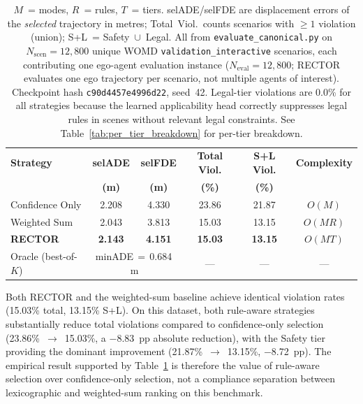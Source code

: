 \begin{table}[t]
\centering
\caption{Selection Strategy Comparison: Accuracy, Compliance, and Complexity (Protocol~A)}
\label{tab:selection_strategy}
\setlength{\tabcolsep}{3pt}
\begin{tabular}{lccccc}
\toprule
\textbf{Strategy} & \textbf{selADE} & \textbf{selFDE} & \textbf{Total Viol.} & \textbf{S+L Viol.} & \textbf{Complexity} \\
 & \textbf{(m)} & \textbf{(m)} & \textbf{(\%)} & \textbf{(\%)} & \\
\midrule
Confidence Only & 2.208 & 4.330 & 23.86 & 21.87 & $O(M)$ \\
Weighted Sum & 2.043 & 3.813 & 15.03 & 13.15 & $O(MR)$ \\
\textbf{RECTOR} & \textbf{2.143} & \textbf{4.151} & \textbf{15.03} & \textbf{13.15} & $O(MT)$ \\
\midrule
Oracle (best-of-$K$) & \multicolumn{2}{c}{minADE\,$=$\,0.684\,m} & --- & --- & --- \\
\bottomrule
\end{tabular}
\vspace{1mm}
\caption*{\footnotesize $M$~= modes, $R$~= rules, $T$~= tiers.  selADE/selFDE are displacement errors of the \emph{selected} trajectory in metres; Total~Viol.\ counts scenarios with $\geq 1$ violation (union); S+L~= Safety~$\cup$~Legal.  All from \texttt{evaluate\_canonical.py} on $N_{\text{scen}}{=}12{,}800$ unique WOMD \texttt{validation\_interactive} scenarios, each contributing one ego-agent evaluation instance ($N_{\text{eval}}{=}12{,}800$; RECTOR evaluates one ego trajectory per scenario, not multiple agents of interest).  Checkpoint hash \texttt{c90d4457e4996d22}, seed~42.  Legal-tier violations are 0.0\% for all strategies because the learned applicability head correctly suppresses legal rules in scenes without relevant legal constraints.  See Table~\ref{tab:per_tier_breakdown} for per-tier breakdown.}
\end{table}

Both RECTOR and the weighted-sum baseline achieve identical violation rates (15.03\% total, 13.15\% S+L).  On this dataset, both rule-aware strategies substantially reduce total violations compared to confidence-only selection (23.86\%~$\to$~15.03\%, a $-$8.83~pp absolute reduction), with the Safety tier providing the dominant improvement (21.87\%~$\to$~13.15\%, $-$8.72~pp).  The empirical result supported by Table~\ref{tab:selection_strategy} is therefore the value of rule-aware selection over confidence-only selection, not a compliance separation between lexicographic and weighted-sum ranking on this benchmark.

